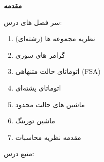 

\begin{center}
    \textbf{مقدمه}
\end{center}


سر فصل های درس:
\begin{enumerate}
    \item نظریه مجموعه ها (رشته‌ای)
    \item    گرامر های سوری
    \item    اتوماتای حالت متنهاهی    (FSA)
    \item    اتوماتای پشته‌ای
    \item    ماشین های حالت محدود
    \item    ماشین تورینگ
    \item    مقدمه نظریه محاسبات
\end{enumerate}

منبع درس:\\ 
